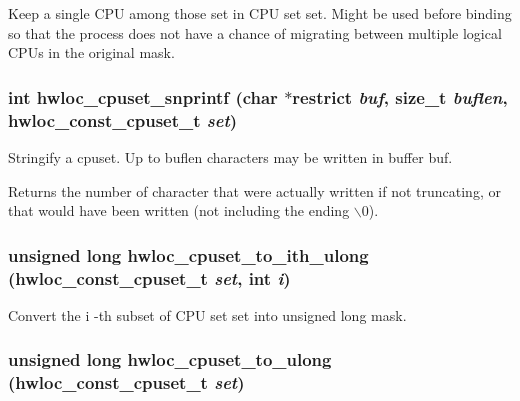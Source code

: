 Keep a single CPU among those set in CPU set {\ttfamily set}. Might be used before binding so that the process does not have a chance of migrating between multiple logical CPUs in the original mask. \hypertarget{group__hwlocality__cpuset_gae60387d479de85cd556ce5faa8f0894e}{
\subsubsection[{hwloc\_\-cpuset\_\-snprintf}]{\setlength{\rightskip}{0pt plus 5cm}int hwloc\_\-cpuset\_\-snprintf (char $\ast$restrict {\em buf}, \/  size\_\-t {\em buflen}, \/  {\bf hwloc\_\-const\_\-cpuset\_\-t} {\em set})}}
\label{group__hwlocality__cpuset_gae60387d479de85cd556ce5faa8f0894e}


Stringify a cpuset. Up to {\ttfamily buflen} characters may be written in buffer {\ttfamily buf}.

\begin{DoxyReturn}{Returns}
the number of character that were actually written if not truncating, or that would have been written (not including the ending $\backslash$0). 
\end{DoxyReturn}
\hypertarget{group__hwlocality__cpuset_ga15761bb808fef3477b0cfb4f9112d29d}{
\subsubsection[{hwloc\_\-cpuset\_\-to\_\-ith\_\-ulong}]{\setlength{\rightskip}{0pt plus 5cm}unsigned long hwloc\_\-cpuset\_\-to\_\-ith\_\-ulong ({\bf hwloc\_\-const\_\-cpuset\_\-t} {\em set}, \/  int {\em i})}}
\label{group__hwlocality__cpuset_ga15761bb808fef3477b0cfb4f9112d29d}


Convert the {\ttfamily i} -\/th subset of CPU set {\ttfamily set} into unsigned long mask. \hypertarget{group__hwlocality__cpuset_gab5930725c5193c3c3864989b15c746f4}{
\subsubsection[{hwloc\_\-cpuset\_\-to\_\-ulong}]{\setlength{\rightskip}{0pt plus 5cm}unsigned long hwloc\_\-cpuset\_\-to\_\-ulong ({\bf hwloc\_\-const\_\-cpuset\_\-t} {\em set})}}
\label{group__hwlocality__cpuset_gab5930725c5193c3c3864989b15c746f4}


